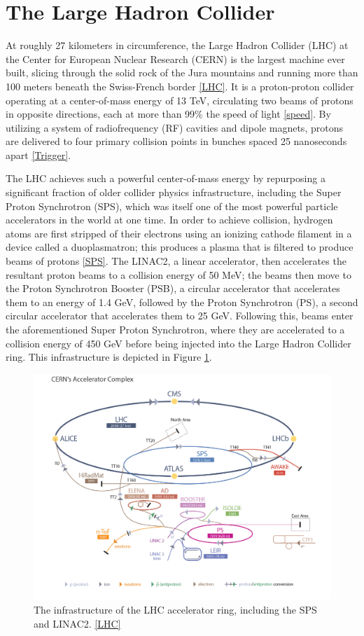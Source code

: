 \section{The Large Hadron Collider} \label{sec:LHC} 

At roughly 27 kilometers in circumference, the Large Hadron Collider (LHC) at the Center for European Nuclear Research (CERN) is the largest machine ever built, slicing through the solid rock of the Jura mountains and running more than 100 meters beneath the Swiss-French border \ref{LHC}. It is a proton-proton collider operating at a center-of-mass energy of 13 TeV, circulating two beams of protons in opposite directions, each at more than 99\% the speed of light \ref{speed}. By utilizing a system of radiofrequency (RF) cavities and dipole magnets, protons are delivered to four primary collision points in bunches spaced 25 nanoseconds apart \ref{Trigger}.

The LHC achieves such a powerful center-of-mass energy by repurposing a significant fraction of older collider physics infrastructure, including the Super Proton Synchrotron (SPS), which was itself one of the most powerful particle accelerators in the world at one time. In order to achieve collision, hydrogen atoms are first stripped of their electrons using an ionizing cathode filament in a device called a duoplasmatron; this produces a plasma that is filtered to produce beams of protons \ref{SPS}. The LINAC2, a linear accelerator, then accelerates the resultant proton beams to a collision energy of 50 MeV; the beams then move to the Proton Synchrotron Booster (PSB), a circular accelerator that accelerates them to an energy of 1.4 GeV, followed by the Proton Synchrotron (PS), a second circular accelerator that accelerates them to 25 GeV. Following this, beams enter the aforementioned Super Proton Synchrotron, where they are accelerated to a collision energy of 450 GeV before being injected into the Large Hadron Collider ring. This infrastructure is depicted in Figure \ref{fig:LHC}.

\begin{figure}
  \includegraphics[width=\linewidth]{figures/detector_chapter/LHCRing.png}
  \caption{The infrastructure of the LHC accelerator ring, including the SPS and LINAC2. \ref{LHC}}
  \label{fig:LHC}
\end{figure}

